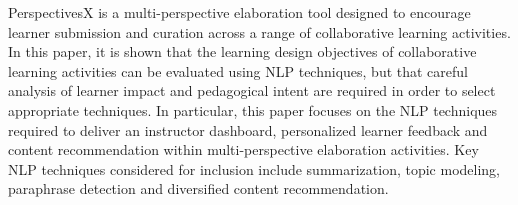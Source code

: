 PerspectivesX is a multi-perspective elaboration tool designed to encourage learner submission and curation across a range of collaborative learning activities. In this paper, it is shown that the learning design objectives of collaborative learning activities can be evaluated using NLP techniques, but that careful analysis of learner impact and pedagogical intent are required in order to select appropriate techniques. In particular, this paper focuses on the NLP techniques required to deliver an instructor dashboard, personalized learner feedback and content recommendation within multi-perspective elaboration activities. Key NLP techniques considered for inclusion include summarization, topic modeling, paraphrase detection and diversified content recommendation.
